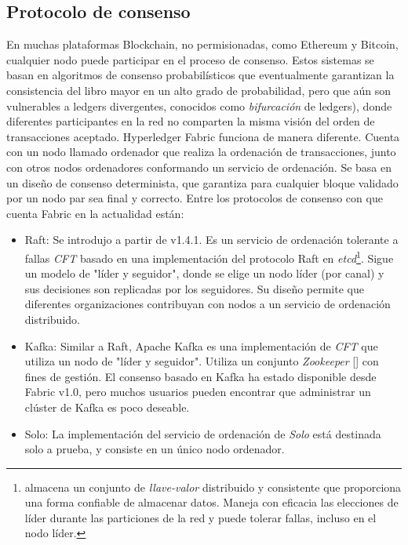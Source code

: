 \subsection{Protocolo de consenso}
En muchas plataformas Blockchain, no permisionadas, como Ethereum y Bitcoin, cualquier nodo puede participar en el proceso de consenso. Estos sistemas se basan en algoritmos de consenso probabil\'isticos que eventualmente garantizan la consistencia del libro mayor en un alto grado de probabilidad, pero que a\'un son vulnerables a ledgers divergentes, conocidos como \emph{bifurcaci\'on} de ledgers), donde diferentes participantes en la red no comparten la misma visi\'on del orden de transacciones aceptado. 
Hyperledger Fabric funciona de manera diferente. Cuenta con un nodo llamado ordenador que realiza la ordenaci\'on de transacciones, junto con otros nodos ordenadores conformando un servicio de ordenaci\'on. Se basa en un dise\~no de consenso determinista, que garantiza para cualquier bloque validado por un nodo par sea final y correcto.
Entre los protocolos de consenso con que cuenta Fabric en la actualidad est\'an:
\begin{itemize}
\item Raft: Se introdujo a partir de v1.4.1. Es un servicio de ordenaci\'on tolerante a fallas \emph{CFT} basado en una implementaci\'on del protocolo Raft en \emph{etcd}\footnote{almacena un conjunto de \emph{llave-valor} distribuido y consistente que proporciona una forma confiable de almacenar datos. Maneja con eficacia las elecciones de l\'ider durante las particiones de la red y puede tolerar fallas, incluso en el nodo l\'ider.}. Sigue un modelo de "l\'ider y seguidor", donde se elige un nodo l\'ider (por canal) y sus decisiones son replicadas por los seguidores. Su dise\~no permite que diferentes organizaciones contribuyan con nodos a un servicio de ordenaci\'on distribuido.

\item Kafka: Similar a Raft, Apache Kafka es una implementaci\'on de \emph{CFT} que utiliza un nodo de "l\'ider y seguidor". Utiliza un conjunto \emph{Zookeeper} [\cite{junqueira2013zookeeper}] con fines de gesti\'on. El consenso basado en Kafka ha estado disponible desde Fabric v1.0, pero muchos usuarios pueden encontrar que administrar un cl\'uster de Kafka es poco deseable.

\item Solo: La implementaci\'on del servicio de ordenaci\'on de \emph{Solo} est\'a destinada solo a prueba, y consiste en un \'unico nodo ordenador.
\end{itemize}

